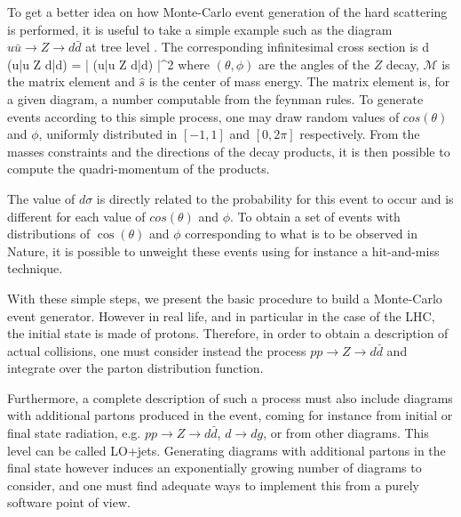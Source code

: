             To get a better idea on how Monte-Carlo event generation of the hard scattering
            is performed, it is useful to take a simple example such as the diagram
            $u\bar{u} \rightarrow Z \rightarrow d\bar{d}$ at tree level \cite{MCGenLesHouches}. The corresponding
            infinitesimal cross section is
            {
                d \sigma(u\bar{u} \rightarrow Z \rightarrow d\bar{d})
                =
                \left|
                    (u\bar{u} \rightarrow Z \rightarrow d\bar{d})
                \right|^2
            }
            where $(\theta,\phi)$ are the angles of the $Z$ decay, $\mathcal{M}$
            is the matrix element and $\hat{s}$ is the center of mass energy. The matrix
            element is, for a given diagram, a number computable from the feynman rules.
            To generate events according to this simple process, one may draw random
            values of $cos(\theta)$ and $\phi$, uniformly distributed in $[-1, 1]$ and
            $[0,2\pi]$ respectively. From the masses constraints and the directions of the
            decay products, it is then possible to compute the quadri-momentum of the products.

            The value of $d\sigma$ is directly related to the probability for this event
            to occur and is different for each value of $cos(\theta)$ and $\phi$. To obtain
            a set of events with distributions of $\cos(\theta)$ and $\phi$ corresponding to
            what is to be observed in Nature, it is possible to unweight these events using
            for instance a hit-and-miss technique.

            With these simple steps, we present the basic procedure to build a Monte-Carlo
            event generator. However in real life, and in particular in the case of the
            LHC, the initial state is made of protons. Therefore, in order to obtain a
            description of actual collisions, one must consider instead the process
            $pp \rightarrow Z \rightarrow d\bar{d}$ and integrate over the parton distribution
            function.

            Furthermore, a complete description of such a process must also include
            diagrams with additional partons produced in the event, coming for instance
            from initial or final state radiation, e.g. $pp \rightarrow Z \rightarrow
            d\bar{d}$, $d\rightarrow dg$, or from other diagrams. This level can be called
            LO+jets. Generating diagrams with additional partons in the final state however
            induces an exponentially growing number of diagrams to consider, and one must
            find adequate ways to implement this from a purely software point of view.

